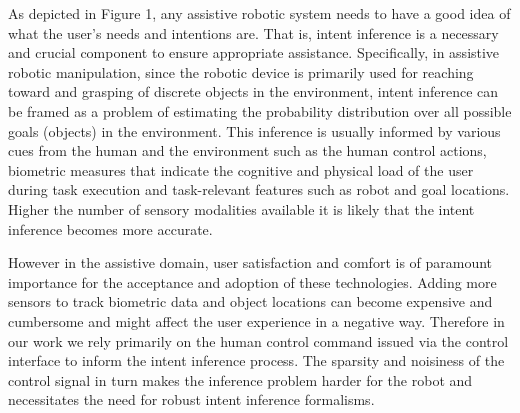 As depicted in Figure 1, any assistive robotic system needs to have a good idea of what the user's needs and intentions are. That is, intent inference is a necessary and crucial component to ensure appropriate assistance. Specifically, in assistive robotic manipulation, since the robotic device is primarily used for reaching toward and grasping of discrete objects in the environment, intent inference can be framed as a problem of estimating the probability distribution over all possible goals (objects) in the environment. This inference is usually informed by various cues from the human and the environment such as the human control actions, biometric measures that indicate the cognitive and physical load of the user during task execution and task-relevant features such as robot and goal locations. Higher the number of sensory modalities available it is likely that the intent inference becomes more accurate. 

However in the assistive domain, user satisfaction and comfort is of paramount importance for the acceptance and adoption of these technologies. Adding more sensors to track biometric data and object locations can become expensive and cumbersome and might affect the user experience in a negative way. Therefore in our work we rely primarily on the human control command issued via the control interface to inform the intent inference process. The sparsity and noisiness of the control signal in turn makes the inference problem harder for the robot and necessitates the need for robust intent inference formalisms. 

